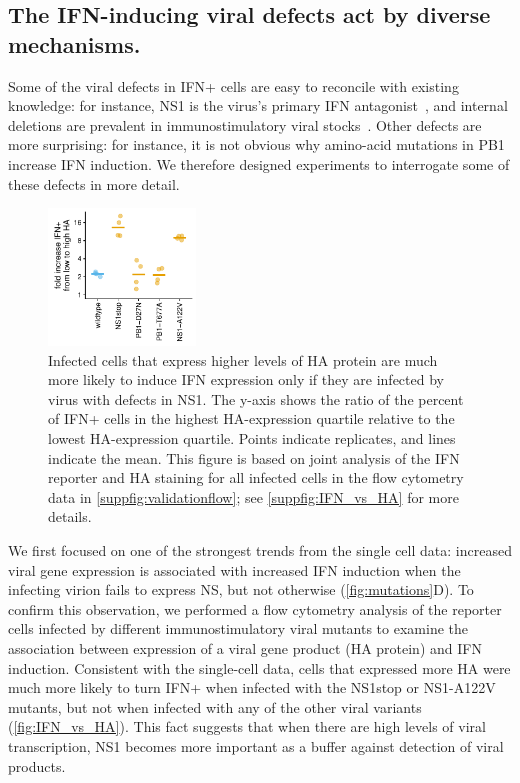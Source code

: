 \documentclass[lineno]{asm-article}
\newcommand{\FIG}[1]{\autoref{fig:#1}}
\newcommand{\SUPPFIG}[1]{\autoref{suppfig:#1}}
\begin{document}
\subsection{The IFN-inducing viral defects act by diverse mechanisms.}
Some of the viral defects in IFN+ cells are easy to reconcile with existing knowledge: for instance, NS1 is the virus's primary IFN antagonist~\cite{garcia1998influenza, hale2008multifunctional}, and internal deletions are prevalent in immunostimulatory viral stocks~\cite{wang2018cell, baum2010preference, tapia2013defective, boergeling2015evidence, dimmock2015cloned, liu2019inhibition}.
Other defects are more surprising: for instance, it is not obvious why amino-acid mutations in PB1 increase IFN induction.
We therefore designed experiments to interrogate some of these defects in more detail.

\begin{figure}
\centerline{\includegraphics[width=0.35\textwidth, valign=t]{figures/MutantComparison/p_foldchange.pdf}}
\caption{
Infected cells that express higher levels of HA protein are much more likely to induce IFN expression only if they are infected by virus with defects in NS1.
The y-axis shows the ratio of the percent of IFN+ cells in the highest HA-expression quartile relative to the lowest HA-expression quartile.
Points indicate replicates, and lines indicate the mean.
This figure is based on joint analysis of the IFN reporter and HA staining for all infected cells in the flow cytometry data in \SUPPFIG{validationflow}; see \SUPPFIG{IFN_vs_HA} for more details.
}
\label{fig:IFN_vs_HA}
\end{figure}

We first focused on one of the strongest trends from the single cell data: increased viral gene expression is associated with increased IFN induction when the infecting virion fails to express NS, but not otherwise (\FIG{mutations}D).
To confirm this observation, we performed a flow cytometry analysis of the reporter cells infected by different immunostimulatory viral mutants to examine the association between expression of a viral gene product (HA protein) and IFN induction.  
Consistent with the single-cell data, cells that expressed more HA were much more likely to turn IFN+ when infected with the NS1stop or NS1-A122V mutants, but not when infected with any of the other viral variants (\FIG{IFN_vs_HA}). 
This fact suggests that when there are high levels of viral transcription, NS1 becomes more important as a buffer against detection of viral products.
\end{document}
